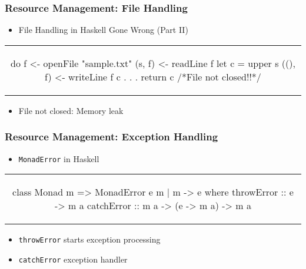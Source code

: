 \begin{frame}[fragile, c]
  \frametitle{Resource Management: File Handling}
  \begin{center}

  \begin{itemize}
  \item File Handling in Haskell Gone Wrong (Part II)
  \end{itemize}
  \begin{tabular}[h]{c}
    \begin{haskell}
    do f  <- openFile "sample.txt"
       (s, f)  <- readLine f
       let c = upper s
       ((), f) <- writeLine f c
           .
           .
           .
       return c /*File not closed!!*/
     \end{haskell}
  \end{tabular}
  \begin{itemize}
  \item File not closed: Memory leak
  \end{itemize}
  \end{center}
\end{frame}

\begin{frame}[fragile, c]
  \frametitle{Resource Management: Exception Handling}
  \begin{center}
  \begin{itemize}
  \item \texttt{MonadError}\citep{liang_monad_1995} in Haskell
  \end{itemize}
  \begin{tabular}[h]{c}
    \begin{haskell}
class Monad m => MonadError e m | m -> e where
    throwError :: e -> m a
    catchError :: m a -> (e -> m a) -> m a
     \end{haskell}
  \end{tabular}
  \begin{itemize}
  \item \texttt{throwError} starts exception processing
  \item \texttt{catchError} exception handler
  \end{itemize}
  \end{center}
\end{frame}

